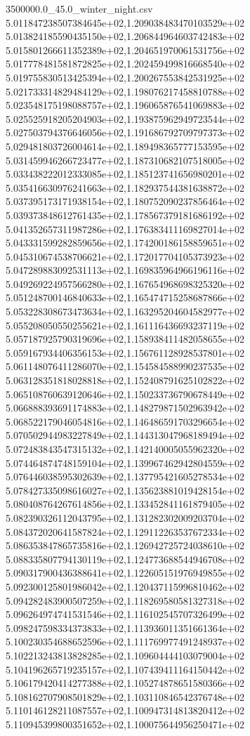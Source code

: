 \begin{filecontents*}{3500000.0_45.0_winter_night.csv}
5.011847238507384645e+02,1.209038483470103529e+02
5.013824185590435150e+02,1.206844964603742483e+02
5.015801266611352389e+02,1.204651970061531756e+02
5.017778481581872825e+02,1.202459499816668540e+02
5.019755830513425394e+02,1.200267553842531925e+02
5.021733314829484129e+02,1.198076217458810788e+02
5.023548175198088757e+02,1.196065876541069883e+02
5.025525918205204903e+02,1.193875962949723544e+02
5.027503794376646056e+02,1.191686792709797373e+02
5.029481803726004614e+02,1.189498365777153595e+02
5.031459946266723477e+02,1.187310682107518005e+02
5.033438222012333085e+02,1.185123741656980201e+02
5.035416630976241663e+02,1.182937544381638872e+02
5.037395173171938154e+02,1.180752090237856464e+02
5.039373848612761435e+02,1.178567379181686192e+02
5.041352657311987286e+02,1.176383411169827014e+02
5.043331599282859656e+02,1.174200186158859651e+02
5.045310674538706621e+02,1.172017704105373923e+02
5.047289883092531113e+02,1.169835964966196116e+02
5.049269224957566280e+02,1.167654968698325320e+02
5.051248700146840633e+02,1.165474715258687866e+02
5.053228308673473634e+02,1.163295204604582977e+02
5.055208050550255621e+02,1.161116436693237119e+02
5.057187925790319696e+02,1.158938411482058655e+02
5.059167934406356153e+02,1.156761128928537801e+02
5.061148076411286070e+02,1.154584588990237535e+02
5.063128351818028818e+02,1.152408791625102822e+02
5.065108760639120646e+02,1.150233736790678449e+02
5.066888393691174883e+02,1.148279871502963942e+02
5.068522179046054816e+02,1.146486591703296654e+02
5.070502944983227849e+02,1.144313047968189494e+02
5.072483843547315132e+02,1.142140005055962320e+02
5.074464874748159104e+02,1.139967462942804559e+02
5.076446038595302639e+02,1.137795421605278534e+02
5.078427335098616027e+02,1.135623881019428154e+02
5.080408764267614856e+02,1.133452841161879405e+02
5.082390326112043795e+02,1.131282302009203704e+02
5.084372020641587824e+02,1.129112263537672334e+02
5.086353847865735816e+02,1.126942725724038610e+02
5.088335807794130119e+02,1.124773688544946708e+02
5.090317900436388641e+02,1.122605151976949855e+02
5.092300125801986042e+02,1.120437115996810462e+02
5.094282483900507259e+02,1.118269580581327318e+02
5.096264974741531546e+02,1.116102545707326499e+02
5.098247598334373833e+02,1.113936011351661364e+02
5.100230354688652596e+02,1.111769977491248937e+02
5.102213243813828285e+02,1.109604444103079004e+02
5.104196265719235157e+02,1.107439411164150442e+02
5.106179420414277388e+02,1.105274878651580366e+02
5.108162707908501829e+02,1.103110846542376748e+02
5.110146128211087557e+02,1.100947314813820412e+02
5.110945399800351652e+02,1.100075644956250471e+02

\end{filecontents*}

